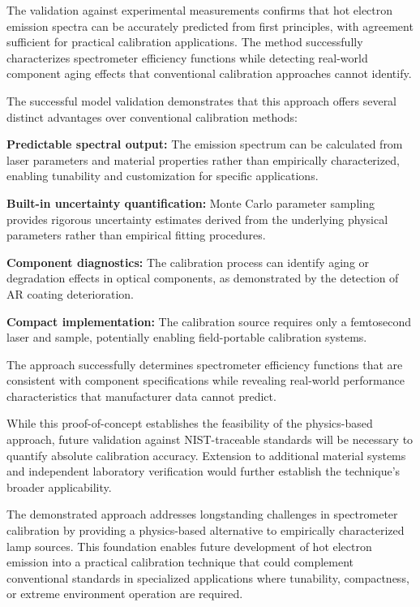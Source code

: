 \documentclass[
	parskip=half,
	a4paper,
]{scrarticle}
\begin{document}
The validation against experimental measurements confirms that hot electron emission spectra can be accurately predicted from first principles, with agreement sufficient for practical calibration applications. The method successfully characterizes spectrometer efficiency functions while detecting real-world component aging effects that conventional calibration approaches cannot identify.

The successful model validation demonstrates that this approach offers several distinct advantages over conventional calibration methods:

\textbf{Predictable spectral output:} The emission spectrum can be calculated from laser parameters and material properties rather than empirically characterized, enabling tunability and customization for specific applications.

\textbf{Built-in uncertainty quantification:} Monte Carlo parameter sampling provides rigorous uncertainty estimates derived from the underlying physical parameters rather than empirical fitting procedures.

\textbf{Component diagnostics:} The calibration process can identify aging or degradation effects in optical components, as demonstrated by the detection of AR coating deterioration.

\textbf{Compact implementation:} The calibration source requires only a femtosecond laser and sample, potentially enabling field-portable calibration systems.

The approach successfully determines spectrometer efficiency functions that are consistent with component specifications while revealing real-world performance characteristics that manufacturer data cannot predict.

While this proof-of-concept establishes the feasibility of the physics-based approach, future validation against NIST-traceable standards will be necessary to quantify absolute calibration accuracy. Extension to additional material systems and independent laboratory verification would further establish the technique's broader applicability.

The demonstrated approach addresses longstanding challenges in spectrometer calibration by providing a physics-based alternative to empirically characterized lamp sources. This foundation enables future development of hot electron emission into a practical calibration technique that could complement conventional standards in specialized applications where tunability, compactness, or extreme environment operation are required.


\printbibliography
\end{document}
